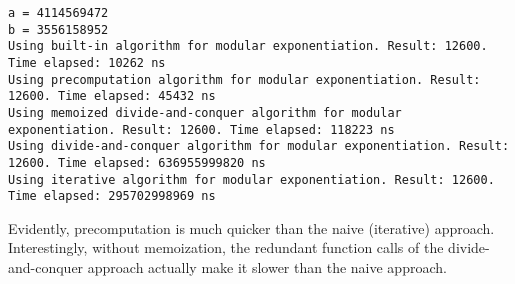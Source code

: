 \documentclass[a4paper,10pt]{article}
\begin{document}
\begin{lstlisting}
a = 4114569472
b = 3556158952
Using built-in algorithm for modular exponentiation. Result: 12600. Time elapsed: 10262 ns
Using precomputation algorithm for modular exponentiation. Result: 12600. Time elapsed: 45432 ns
Using memoized divide-and-conquer algorithm for modular exponentiation. Result: 12600. Time elapsed: 118223 ns
Using divide-and-conquer algorithm for modular exponentiation. Result: 12600. Time elapsed: 636955999820 ns
Using iterative algorithm for modular exponentiation. Result: 12600. Time elapsed: 295702998969 ns
\end{lstlisting}
Evidently, precomputation is much quicker than the naive (iterative) approach. Interestingly, without memoization, the redundant function calls of the divide-and-conquer approach actually make it slower than the naive approach.
\end{document}
